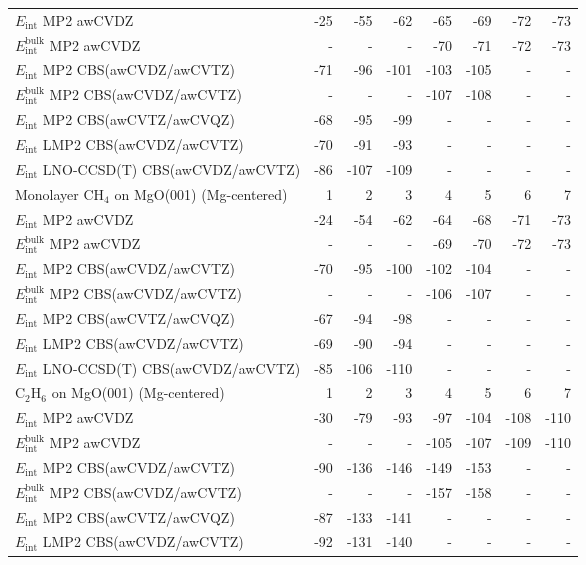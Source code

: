 \begin{longtable}{lrrrrrrr}
$E_\textrm{int}$ MP2 awCVDZ & -25 & -55 & -62 & -65 & -69 & -72 & -73 \\
$E_\textrm{int}^\textrm{bulk}$ MP2 awCVDZ & - & - & - & -70 & -71 & -72 & -73 \\
$E_\textrm{int}$ MP2 CBS(awCVDZ/awCVTZ) & -71 & -96 & -101 & -103 & -105 & - & - \\
$E_\textrm{int}^\textrm{bulk}$ MP2 CBS(awCVDZ/awCVTZ) & - & - & - & -107 & -108 & - & - \\
$E_\textrm{int}$ MP2 CBS(awCVTZ/awCVQZ) & -68 & -95 & -99 & - & - & - & - \\
$E_\textrm{int}$ LMP2 CBS(awCVDZ/awCVTZ) & -70 & -91 & -93 & - & - & - & - \\
$E_\textrm{int}$ LNO-CCSD(T) CBS(awCVDZ/awCVTZ) & -86 & -107 & -109 & - & - & - & - \\
\toprule
Monolayer CH$_4$ on MgO(001) (Mg-centered) & 1 & 2 & 3 & 4 & 5 & 6 & 7 \\ 
\midrule
$E_\textrm{int}$ MP2 awCVDZ & -24 & -54 & -62 & -64 & -68 & -71 & -73 \\
$E_\textrm{int}^\textrm{bulk}$ MP2 awCVDZ & - & - & - & -69 & -70 & -72 & -73 \\
$E_\textrm{int}$ MP2 CBS(awCVDZ/awCVTZ) & -70 & -95 & -100 & -102 & -104 & - & - \\
$E_\textrm{int}^\textrm{bulk}$ MP2 CBS(awCVDZ/awCVTZ) & - & - & - & -106 & -107 & - & - \\
$E_\textrm{int}$ MP2 CBS(awCVTZ/awCVQZ) & -67 & -94 & -98 & - & - & - & - \\
$E_\textrm{int}$ LMP2 CBS(awCVDZ/awCVTZ) & -69 & -90 & -94 & - & - & - & - \\
$E_\textrm{int}$ LNO-CCSD(T) CBS(awCVDZ/awCVTZ) & -85 & -106 & -110 & - & - & - & - \\
\toprule
C$_2$H$_6$ on MgO(001) (Mg-centered) & 1 & 2 & 3 & 4 & 5 & 6 & 7 \\ 
\midrule
$E_\textrm{int}$ MP2 awCVDZ & -30 & -79 & -93 & -97 & -104 & -108 & -110 \\
$E_\textrm{int}^\textrm{bulk}$ MP2 awCVDZ & - & - & - & -105 & -107 & -109 & -110 \\
$E_\textrm{int}$ MP2 CBS(awCVDZ/awCVTZ) & -90 & -136 & -146 & -149 & -153 & - & - \\
$E_\textrm{int}^\textrm{bulk}$ MP2 CBS(awCVDZ/awCVTZ) & - & - & - & -157 & -158 & - & - \\
$E_\textrm{int}$ MP2 CBS(awCVTZ/awCVQZ) & -87 & -133 & -141 & - & - & - & - \\
$E_\textrm{int}$ LMP2 CBS(awCVDZ/awCVTZ) & -92 & -131 & -140 & - & - & - & - \\

\end{longtable}
